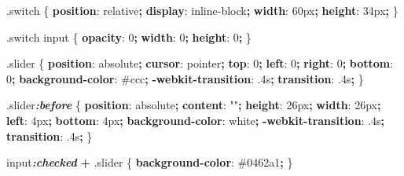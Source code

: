 \documentclass[
  10pt,
]{krantz}
\makeatletter
\newenvironment{Shaded}{\begin{snugshade}}{\end{snugshade}}
\newcommand{\ConstantTok}[1]{\textcolor[rgb]{0,0,0}{#1}}
\newcommand{\DataTypeTok}[1]{\textcolor[rgb]{0.27,0.27,0.27}{#1}}
\newcommand{\DecValTok}[1]{\textcolor[rgb]{0.06,0.06,0.06}{#1}}
\newcommand{\FunctionTok}[1]{\textcolor[rgb]{0,0,0}{#1}}
\newcommand{\InformationTok}[1]{\textcolor[rgb]{0.37,0.37,0.37}{\textbf{\textit{#1}}}}
\newcommand{\KeywordTok}[1]{\textcolor[rgb]{0.27,0.27,0.27}{\textbf{#1}}}
\newcommand{\NormalTok}[1]{#1}
\newcommand{\OperatorTok}[1]{\textcolor[rgb]{0.43,0.43,0.43}{\textbf{#1}}}
\newcommand{\StringTok}[1]{\textcolor[rgb]{0.5,0.5,0.5}{#1}}
\newenvironment{kframe}{%
\medskip{}
\setlength{\fboxsep}{.8em}
 \def\at@end@of@kframe{}%
 \ifinner\ifhmode%
  \def\at@end@of@kframe{\end{minipage}}%
  \begin{minipage}{\columnwidth}%
 \fi\fi%
 \def\FrameCommand##1{\hskip\@totalleftmargin \hskip-\fboxsep
 \colorbox{shadecolor}{##1}\hskip-\fboxsep
     \hskip-\linewidth \hskip-\@totalleftmargin \hskip\columnwidth}%
 \MakeFramed {\advance\hsize-\width
   \@totalleftmargin\z@ \linewidth\hsize
   \@setminipage}}%
 {\par\unskip\endMakeFramed%
 \at@end@of@kframe}
\renewenvironment{Shaded}{\begin{kframe}}{\end{kframe}}
\makeatother
\begin{document}
\begin{Shaded}
\begin{Highlighting}[]
\FunctionTok{.switch}\NormalTok{ \{}
  \KeywordTok{position}\NormalTok{: }\DecValTok{relative}\OperatorTok{;}
  \KeywordTok{display}\NormalTok{: }\DecValTok{inline{-}block}\OperatorTok{;}
  \KeywordTok{width}\NormalTok{: }\DecValTok{60}\DataTypeTok{px}\OperatorTok{;}
  \KeywordTok{height}\NormalTok{: }\DecValTok{34}\DataTypeTok{px}\OperatorTok{;}
\NormalTok{\}}

\FunctionTok{.switch}\NormalTok{ input \{ }
  \KeywordTok{opacity}\NormalTok{: }\DecValTok{0}\OperatorTok{;}
  \KeywordTok{width}\NormalTok{: }\DecValTok{0}\OperatorTok{;}
  \KeywordTok{height}\NormalTok{: }\DecValTok{0}\OperatorTok{;}
\NormalTok{\}}

\FunctionTok{.slider}\NormalTok{ \{}
  \KeywordTok{position}\NormalTok{: }\DecValTok{absolute}\OperatorTok{;}
  \KeywordTok{cursor}\NormalTok{: }\DecValTok{pointer}\OperatorTok{;}
  \KeywordTok{top}\NormalTok{: }\DecValTok{0}\OperatorTok{;}
  \KeywordTok{left}\NormalTok{: }\DecValTok{0}\OperatorTok{;}
  \KeywordTok{right}\NormalTok{: }\DecValTok{0}\OperatorTok{;}
  \KeywordTok{bottom}\NormalTok{: }\DecValTok{0}\OperatorTok{;}
  \KeywordTok{background{-}color}\NormalTok{: }\ConstantTok{\#ccc}\OperatorTok{;}
  \KeywordTok{{-}webkit{-}transition}\NormalTok{: }\DecValTok{.4}\DataTypeTok{s}\OperatorTok{;}
  \KeywordTok{transition}\NormalTok{: }\DecValTok{.4}\DataTypeTok{s}\OperatorTok{;}
\NormalTok{\}}

\FunctionTok{.slider}\InformationTok{:before}\NormalTok{ \{}
  \KeywordTok{position}\NormalTok{: }\DecValTok{absolute}\OperatorTok{;}
  \KeywordTok{content}\NormalTok{: }\StringTok{""}\OperatorTok{;}
  \KeywordTok{height}\NormalTok{: }\DecValTok{26}\DataTypeTok{px}\OperatorTok{;}
  \KeywordTok{width}\NormalTok{: }\DecValTok{26}\DataTypeTok{px}\OperatorTok{;}
  \KeywordTok{left}\NormalTok{: }\DecValTok{4}\DataTypeTok{px}\OperatorTok{;}
  \KeywordTok{bottom}\NormalTok{: }\DecValTok{4}\DataTypeTok{px}\OperatorTok{;}
  \KeywordTok{background{-}color}\NormalTok{: }\ConstantTok{white}\OperatorTok{;}
  \KeywordTok{{-}webkit{-}transition}\NormalTok{: }\DecValTok{.4}\DataTypeTok{s}\OperatorTok{;}
  \KeywordTok{transition}\NormalTok{: }\DecValTok{.4}\DataTypeTok{s}\OperatorTok{;}
\NormalTok{\}}

\NormalTok{input}\InformationTok{:checked} \OperatorTok{+} \FunctionTok{.slider}\NormalTok{ \{}
  \KeywordTok{background{-}color}\NormalTok{: }\ConstantTok{\#0462a1}\OperatorTok{;}
\NormalTok{\}}


\end{Highlighting}
\end{Shaded}
\end{document}
